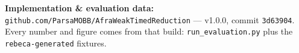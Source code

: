 {\begin{latin}
\vspace{.16cm}
\centering
\fontsize{15}{19}\selectfont
\textbf{Implementation \& evaluation data:}
\nolinkurl{github.com/ParsaMOBB/AfraWeakTimedReduction} — v1.0.0, commit
\texttt{3d63904}. Every number and figure comes from that build:
\texttt{run\_evaluation.py} plus the \texttt{rebeca-generated} fixtures.
\end{latin}
}
